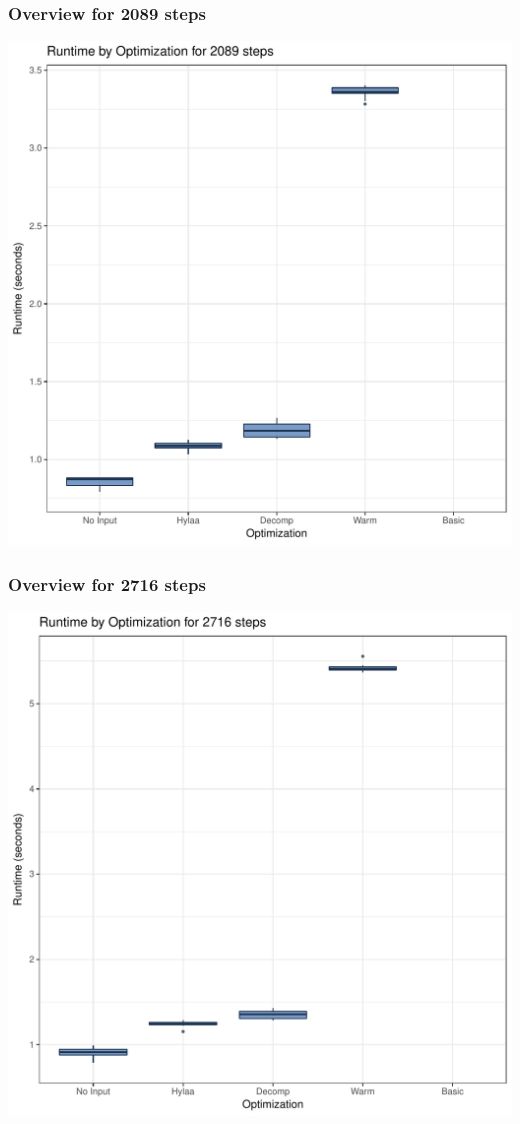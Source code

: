 \documentclass{article}\usepackage[]{graphicx}\usepackage[]{color}
\makeatletter
\def\maxwidth{ %
  \ifdim\Gin@nat@width>\linewidth
    \linewidth
  \else
    \Gin@nat@width
  \fi
}
\newenvironment{knitrout}{}{} %
\makeatother
\begin{document}
\subsubsection{Overview for 2089 steps}
\begin{knitrout}
\color{fgcolor}
\includegraphics[width=\maxwidth]{figure/steps2089-1} 

\end{knitrout}
\subsubsection{Overview for 2716 steps}
\begin{knitrout}
\color{fgcolor}
\includegraphics[width=\maxwidth]{figure/steps2716-1} 

\end{knitrout}
\end{document}
